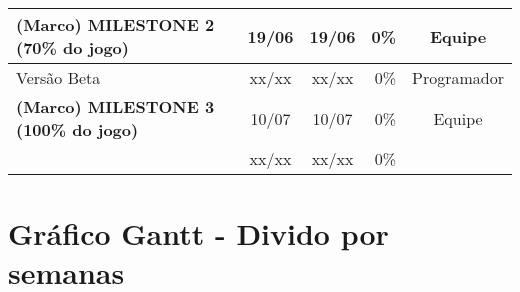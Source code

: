 \documentclass[a4paper, 11pt]{article} %
\begin{document}
\begin{table}[h]
\begin{tabular}{lccrc}
\midrule
\rowcolor[gray]{0.7}
\textbf{(Marco) MILESTONE 2 (70\% do jogo)} & 19/06 & 19/06 & 0\% & Equipe\\
\midrule
Versão Beta                          & xx/xx & xx/xx & 0\%   & Programador \\
\midrule
\rowcolor[gray]{0.7}
\textbf{(Marco) MILESTONE 3 (100\% do jogo)} & 10/07 & 10/07 & 0\% & Equipe\\
\midrule
                                     & xx/xx & xx/xx & 0\%   &      \\
\midrule
\end{tabular}
\end{table}

\newpage
\section*{Gráfico Gantt - Divido por semanas}
\end{document}
